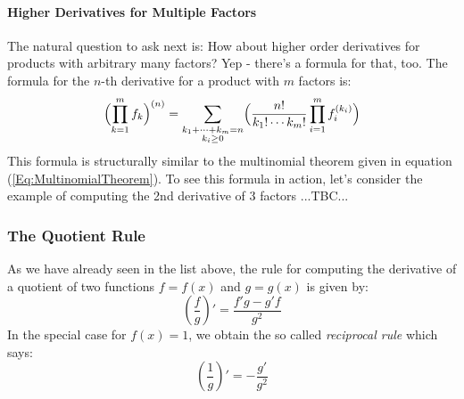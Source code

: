 \paragraph{Higher Derivatives for Multiple Factors}
The natural question to ask next is: How about higher order derivatives for products with arbitrary many factors? Yep - there's a formula for that, too. The formula for the $n$-th derivative for a product with $m$ factors is:
\begin{equation}
\Bigl( \prod_{k=1}^{m} f_k \Bigr)^{(n)} =
\sum_{\substack{k_1 + \cdots + k_m = n \\ k_i \geq 0}} 
\Bigl(
\frac{n!}{k_1! \cdots k_m!}
\prod_{i=1}^{m} f_i^{(k_i)} 
\Bigr)
\end{equation}
This formula is structurally similar to the multinomial theorem given in equation (\ref{Eq:MultinomialTheorem}). To see this formula in action, let's consider the example of computing the 2nd derivative of 3 factors ...TBC...






\subsubsection{The Quotient Rule} 
As we have already seen in the list above, the rule for computing the derivative of a quotient of two functions $f = f(x)$ and $g = g(x)$ is given by:
\begin{equation}
\left( \frac{f}{g} \right) ' = 
\frac{f' g - g' f}{g^2}
\end{equation}
In the special case for $f(x) = 1$, we obtain the so called \emph{reciprocal rule} which says:
\begin{equation}
\left( \frac{1}{g} \right) ' = 
- \frac{g'}{g^2}
\end{equation}

